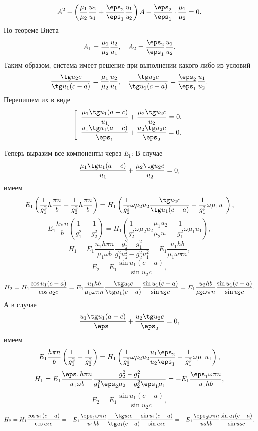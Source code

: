 \documentclass[12pt]{hedsemwork}
\renewcommand{\frac}{\dfrac}
\begin{document}
\[
    A^2 - \left(
    \frac{\mu_1}{\mu_2}\frac{u_2}{u_1} + \frac{\eps_2}{\eps_1}\frac{u_1}{u_2}
    \right)A + \frac{\eps_2}{\eps_1}\cdot\frac{\mu_1}{\mu_2} = 0.
\]
По теореме Виета
\[
    A_1 = \frac{\mu_1}{\mu_2}\frac{u_2}{u_1},\quad
    A_2 = \frac{\eps_2}{\eps_1}\frac{u_1}{u_2}.
\]
Таким образом, система имеет решение при выполнении какого-либо из условий
\[
    \frac{\tg u_2 c}{\tg u_1 (c-a)} =
    \frac{\mu_1}{\mu_2}\frac{u_2}{u_1},\quad
    \frac{\tg u_2 c}{\tg u_1 (c-a)} =
    \frac{\eps_2}{\eps_1}\frac{u_1}{u_2}.
\]
Перепишем их в виде
\[
    \left[
        \begin{array}{l}
            \frac{\mu_1\tg u_1 (a-c)}{u_1} + \frac{\mu_2\tg u_2 c}{u_2} = 0,\\
            \frac{u_1\tg u_1 (a-c)}{\eps_1} + \frac{u_2\tg u_2 c}{\eps_2} = 0.
        \end{array}
    \right.
\]

Теперь выразим все компоненты через \( E_1 \):
В случае
\[
    \frac{\mu_1\tg u_1 (a-c)}{u_1} + \frac{\mu_2\tg u_2 c}{u_2} = 0,
\]
имеем
\[
    E_1\left(\frac{1}{g_1^2} h \frac{\pi n}{b}-
    \frac{1}{g_2^2}h \frac{\pi n}{b}\right) =
    H_1\left(\frac{1}{g_2^2}\omega\mu_2u_2\frac{\tg u_2 c}{\tg u_1 (c-a)}-
    \frac{1}{g_1^2}\omega\mu_1u_1\right),
\]
\[
    E_1\frac{h\pi n}{b}\left(\frac{1}{g_1^2}-\frac{1}{g_2^2}\right)=
    H_1\left(\frac{1}{g_2^2}\omega\mu_2u_2\frac{\mu_1u_2}{\mu_2u_1}-
    \frac{1}{g_1^2}\omega\mu_1u_1\right),
\]
\[
    H_1 = E_1\frac{u_1h\pi n}{\mu_1\omega b}
    \frac{g_2^2-g_1^2}{g_1^2u_2^2 - g_2^2u_1^2} =
    E_1\frac{u_1hb}{\mu_1\omega\pi n},
\]
\[
    E_2 = E_1\frac{\sin u_1(c-a)}{\sin u_2 c},
\]
\[
    H_2 = H_1 \frac{\cos u_1(c-a)}{\cos u_2 c} =
    E_1\frac{u_1hb}{\mu_1\omega\pi n}\frac{\tg u_2c}{\tg u_1(c-a)}
    \frac{\sin u_1(c-a)}{\sin u_2 c} = E_1\frac{u_2hb}{\mu_2\omega\pi n}
    \frac{\sin u_1(c-a)}{\sin u_2 c}.
\]
А в случае
\[
    \frac{u_1\tg u_1 (a-c)}{\eps_1} + \frac{u_2\tg u_2 c}{\eps_2} = 0,
\]
имеем
\[
    E_1\frac{h\pi n}{b}\left(\frac{1}{g_1^2}-\frac{1}{g_2^2}\right)=
    H_1\left(\frac{1}{g_2^2}\omega\mu_2u_2\frac{u_1\eps_2}{u_2\eps_1}-
    \frac{1}{g_1^2}\omega\mu_1u_1\right),
\]
\[
    H_1 = E_1\frac{\eps_1h\pi n}{u_1\omega b}
    \frac{g_2^2-g_1^2}{g_1^2\eps_2\mu_2 - g_2^2\eps_1\mu_1} =
    -E_1\frac{\eps_1\omega\pi n}{u_1hb},
\]
\[
    E_2 = E_1\frac{\sin u_1(c-a)}{\sin u_2 c},
\]
\[
    H_2 = H_1 \frac{\cos u_1(c-a)}{\cos u_2 c} =
    -E_1\frac{\eps_1\omega\pi n}{u_1hb}\frac{\tg u_2c}{\tg u_1(c-a)}
    \frac{\sin u_1(c-a)}{\sin u_2 c} = -E_1\frac{\eps_2\omega\pi n}{u_2hb}
    \frac{\sin u_1(c-a)}{\sin u_2 c}.
\]
\end{document}
